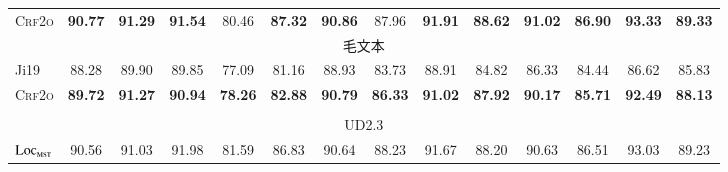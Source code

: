 \begin{table*}[tb]
\begin{tabular}{lccccccccccccc}
        \textsc{Crf2o}                & \textbf{90.77} & \textbf{91.29} & \textbf{91.54}\rlap{$^\dagger$}  & 80.46                           & \textbf{87.32}\rlap{$^\dagger$} & \textbf{90.86}\rlap{$^\dagger$}  & 87.96                           & \textbf{91.91}\rlap{$^\ddagger$} & \textbf{88.62}\rlap{$^\ddagger$} & \textbf{91.02}\rlap{$^\dagger$} & \textbf{86.90}\rlap{$^\ddagger$} & \textbf{93.33}\rlap{$^\ddagger$} & \textbf{89.33}\rlap{$^\ddagger$} \\[1pt]
        \multicolumn{14}{c}{毛文本}                                                                                                                                                                                                                                                                                                                                                                                                                                  \\[1pt]
        Ji19                          & 88.28          & 89.90          & 89.85                            & 77.09                           & 81.16                           & 88.93                            & 83.73                           & 88.91                            & 84.82                            & 86.33                           & 84.44                            & 86.62                            & 85.83                            \\
        \textsc{Crf2o}                & \textbf{89.72} & \textbf{91.27} & \textbf{90.94}                   & \textbf{78.26}                  & \textbf{82.88}                  & \textbf{90.79}                   & \textbf{86.33}                  & \textbf{91.02}                   & \textbf{87.92}                   & \textbf{90.17}                  & \textbf{85.71}                   & \textbf{92.49}                   & \textbf{88.13}                   \\
        \hline
        \\[-9pt]
        \multicolumn{14}{c}{UD2.3}                                                                                                                                                                                                                                                                                                                                                                                                                                   \\[1pt]
        $\textsc{Loc}_{\textsc{mst}}$ & 90.56          & 91.03          & 91.98                            & 81.59                           & 86.83                           & 90.64                            & 88.23                           & 91.67                            & 88.20                            & 90.63                           & 86.51                            & 93.03                            & 89.23                            \\

\end{tabular}
\end{table*}
